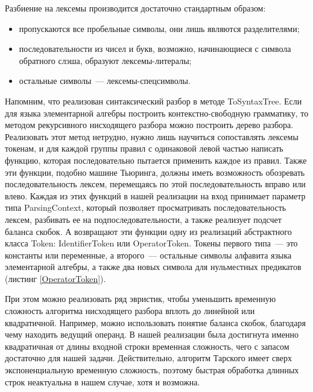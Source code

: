 Разбиение на лексемы производится достаточно стандартным образом:
\begin{itemize}
    \item пропускаются все пробельные символы, они лишь являются разделителями;
    \item последовательности из чисел и букв, возможно, начинающиеся с символа обратного слэша, образуют лексемы-литералы;
    \item остальные символы~--- лексемы-спецсимволы.
\end{itemize}

Напомним, что реализован синтаксический разбор в методе ToSyntaxTree. Если для языка элементарной алгебры построить контекстно-свободную грамматику, то методом рекурсивного нисходящего разбора\cite{Sokolov} можно построить дерево разбора. Реализовать этот метод нетрудно, нужно лишь научиться сопоставлять лексемы токенам, и для каждой группы правил с одинаковой левой частью написать функцию, которая последовательно пытается применить каждое из правил. Также эти функции, подобно машине Тьюринга, должны иметь возможность обозревать последовательность лексем, перемещаясь по этой последовательность вправо или влево. Каждая из этих функций в нашей реализации на вход принимает параметр типа ParsingContext, который позволяет просматривать последовательность лексем, разбивать ее на подпоследовательности, а также реализует подсчет баланса скобок. А возвращают эти функции одну из реализаций абстрактного класса Token: IdentifierToken или OperatorToken. Токены первого типа~--- это константы или переменные, а второго~--- остальные символы алфавита языка элементарной алгебры, а также два новых символа для нульместных предикатов (листинг \ref{OperatorToken}).



При этом можно реализовать ряд эвристик, чтобы уменьшить временную сложность алгоритма нисходящего разбора вплоть до линейной или квадратичной. Например, можно использовать понятие баланса скобок, благодаря чему находить ведущий операнд. В нашей реализации была достигнута именно квадратичная от длины входной строки временная сложность, чего с запасом достаточно для нашей задачи. Действительно, алгоритм Тарского имеет сверх экспоненциальную временную сложность, поэтому быстрая обработка длинных строк неактуальна в нашем случае, хотя и возможна.

